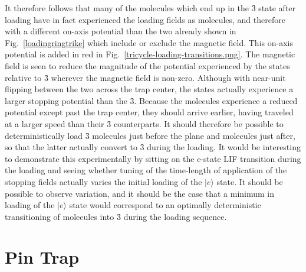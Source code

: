 \documentclass[defaultstyle,11pt]{thesis}
\begin{document}
It therefore follows that many of the molecules which end up in the \f3 state after loading have in fact experienced the loading fields as  molecules, and therefore with a different on-axis potential than the two already shown in Fig.~\ref{loadingringtrike} which include or exclude the magnetic field.
This on-axis potential is added in red in Fig.~\ref{tricycle-loading-transitions.png}.
The magnetic field is seen to reduce the magnitude of the potential experienced by the  states relative to \f3 wherever the magnetic field is non-zero. 
Although with near-unit flipping between the two across the trap center, the  states actually experience a larger stopping potential than the \f3.
Because the  molecules experience a reduced potential except past the trap center, they should arrive earlier, having traveled at a larger speed than their \f3 counterparts.
It should therefore be possible to deterministically load \f3 molecules just before the plane and  molecules just after, so that the latter actually convert to \f3 during the loading.
It would be interesting to demonstrate this experimentally by sitting on the e-state LIF transition during the loading and seeing whether tuning of the time-length of application of the stopping fields actually varies the initial loading of the $|e\rangle$ state.
It should be possible to observe variation, and it should be the case that a minimum in loading of the $|e\rangle$ state would correspond to an optimally deterministic transitioning of  molecules into \f3 during the loading sequence.


\section{Pin Trap}
\end{document}

